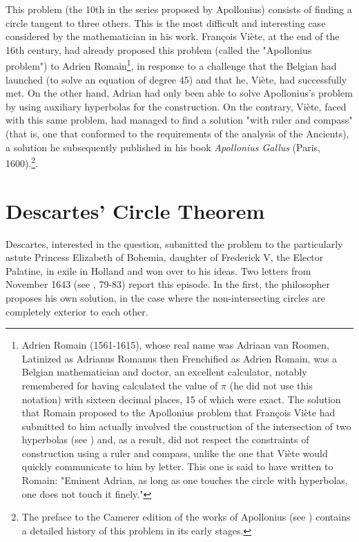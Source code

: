 \documentclass[12pt]{article}
\theoremstyle{définition}
\theoremstyle{remark}
\theoremstyle{plain}
\theoremstyle{plain}
\begin{document}
This problem (the 10th in the series proposed by Apollonius) consists of finding a circle tangent to three others. This is the most difficult and interesting case considered by the mathematician in his work. François Viète, at the end of the 16th century, had already proposed this problem (called the "Apollonius problem") to Adrien Romain\footnote{Adrien Romain (1561-1615), whose real name was Adriaan van Roomen, Latinized as Adrianus Romanus then Frenchified as Adrien Romain, was a Belgian mathematician and doctor, an excellent calculator, notably remembered for having calculated the value of $\pi$ (he did not use this notation) with sixteen decimal places, 15 of which were exact. The solution that Romain proposed to the Apollonius problem that François Viète had submitted to him actually involved the construction of the intersection of two hyperbolas (see \cite{Bosm1}) and, as a result, did not respect the constraints of construction using a ruler and compass, unlike the one that Viète would quickly communicate to him by letter. This one is said to have written to Romain: "Eminent Adrian, as long as one touches the circle with hyperbolas, one does not touch it finely."}, in response to a challenge that the Belgian had launched (to solve an equation of degree 45) and that he, Viète, had successfully met. On the other hand, Adrian had only been able to solve Apollonius's problem by using auxiliary hyperbolas for the construction. On the contrary, Viète, faced with this same problem, had managed to find a solution "with ruler and compass" (that is, one that conformed to the requirements of the analysis of the Ancients), a solution he subsequently published in his book {\it Apollonius Gallus} (Paris, 1600).\footnote{The preface to the Camerer edition of the works of Apollonius (see \cite{Apo}) contains a detailed history of this problem in its early stages.}.

\section{Descartes' Circle Theorem}

Descartes, interested in the question, submitted the problem to the particularly astute Princess Elizabeth of Bohemia, daughter of Frederick V, the Elector Palatine, in exile in Holland and won over to his ideas. Two letters from November 1643 (see \cite{Bey}, 79-83) report this episode. In the first, the philosopher proposes his own solution, in the case where the non-intersecting circles are completely exterior to each other.
\end{document}
